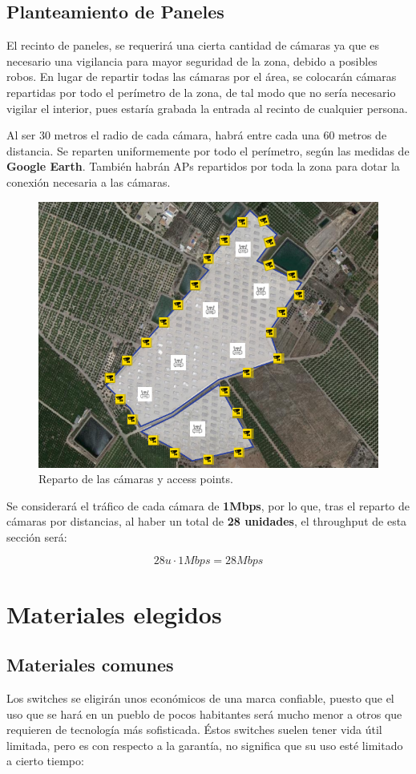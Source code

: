 \documentclass{article}
\begin{document}
\subsection{Planteamiento de Paneles}

El recinto de paneles, se requerirá una cierta cantidad de cámaras ya que es necesario una vigilancia para mayor seguridad de la zona, debido a posibles robos. En lugar de repartir todas las cámaras por el área, se colocarán cámaras repartidas por todo el perímetro de la zona, de tal modo que no sería necesario vigilar el interior, pues estaría grabada la entrada al recinto de cualquier persona.

\quad

Al ser 30 metros el radio de cada cámara, habrá entre cada una 60 metros de distancia. Se reparten uniformemente por todo el perímetro, según las medidas de \textbf{Google Earth}. También habrán APs repartidos por toda la zona para dotar la conexión necesaria a las cámaras. 
\begin{figure}[ht]
    \centering
    \includegraphics[width=0.4\linewidth]{src/camaras.png}
    \caption{\label{fig:camarasnave} Reparto de las cámaras y access points.}
\end{figure}

Se considerará el tráfico de cada cámara de \textbf{1Mbps}, por lo que, tras el reparto de cámaras por distancias, al haber un total de \textbf{28 unidades}, el throughput de esta sección será: 

$$28u \cdot 1Mbps = 28Mbps$$

\section{Materiales elegidos}

\subsection{Materiales comunes}
Los switches se eligirán unos económicos de una marca confiable, puesto que el uso que se hará en un pueblo de pocos habitantes será mucho menor a otros que requieren de tecnología más sofisticada. Éstos switches suelen tener vida útil limitada, pero es con respecto a la garantía, no significa que su uso esté limitado a cierto tiempo:
\end{document}
